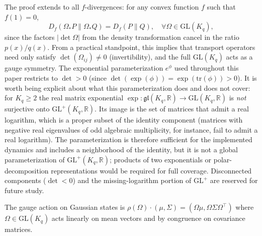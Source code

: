 \documentclass[11pt]{article}
\begin{document}
The proof extends to all $f$-divergences: for any convex function $f$ such that $f(1) = 0$,
\begin{equation}
D_f(\Omega_* P \| \Omega_* Q) = D_f(P \| Q), \quad \forall \Omega \in \mathrm{GL}(K_q),
\end{equation}
since the factors $|\det\Omega|$ from the density transformation cancel in the ratio $p(x)/q(x)$. From a practical standpoint, this implies that transport operators need only satisfy $\det(\Omega_{ij}) \neq 0$ (invertibility), and the full $\mathrm{GL}(K_q)$ acts as a gauge symmetry. The exponential parameterization $e^{\phi}$ used throughout this paper restricts to $\det > 0$ (since $\det(\exp(\phi)) = \exp(\mathrm{tr}(\phi)) > 0$). It is worth being explicit about what this parameterization does and does not cover: for $K_q \ge 2$ the real matrix exponential $\exp: \mathfrak{gl}(K_q, \mathbb{R}) \to \mathrm{GL}(K_q, \mathbb{R})$ is \emph{not} surjective onto $\mathrm{GL}^+(K_q, \mathbb{R})$. Its image is the set of matrices that admit a real logarithm, which is a proper subset of the identity component (matrices with negative real eigenvalues of odd algebraic multiplicity, for instance, fail to admit a real logarithm). The parameterization is therefore sufficient for the implemented dynamics and includes a neighborhood of the identity, but it is not a global parameterization of $\mathrm{GL}^+(K_q, \mathbb{R})$; products of two exponentials or polar-decomposition representations would be required for full coverage. Disconnected components ($\det < 0$) and the missing-logarithm portion of $\mathrm{GL}^+$ are reserved for future study.

The gauge action on Gaussian states is $\rho(\Omega) \cdot (\mu, \Sigma) = (\Omega\mu, \Omega\Sigma\Omega^\top)$ where $\Omega \in \mathrm{GL}(K_q)$ acts linearly on mean vectors and by congruence on covariance matrices.
\end{document}

